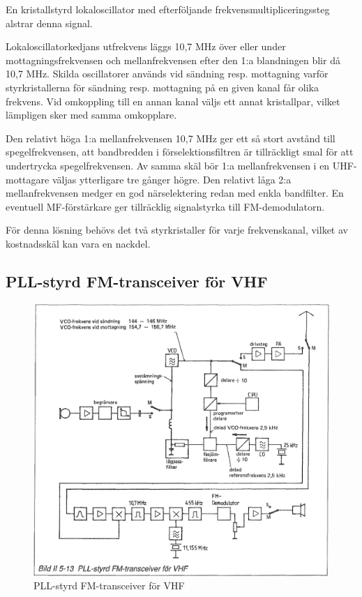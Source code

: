 

En kristallstyrd lokaloscillator med efterföljande
frekvensmultipliceringssteg alstrar denna signal.

Lokaloscillatorkedjans utfrekvens läggs 10,7 MHz över eller under
mottagningsfrekvensen och mellanfrekvensen efter den 1:a blandningen
blir då 10,7 MHz. Skilda oscillatorer används vid sändning
resp. mottagning varför styrkristallerna för sändning resp.
mottagning på en given kanal får olika frekvens. Vid omkoppling till
en annan kanal väljs ett annat kristallpar, vilket lämpligen sker med
samma omkopplare.

Den relativt höga 1:a mellanfrekvensen 10,7 MHz ger ett så stort
avstånd till spegelfrekvensen, att bandbredden i förselektionsfiltren
är tillräckligt smal för att undertrycka spegelfrekvensen. Av samma
skäl bör 1:a mellanfrekvensen i en UHF-mottagare väljas ytterligare
tre gånger högre. Den relativt låga 2:a mellanfrekvensen medger en god
närselektering redan med enkla bandfilter.  En eventuell
MF-förstärkare ger tillräcklig signalstyrka till FM-demodulatorn.

För denna lösning behövs det två styrkristaller för varje
frekvenskanal, vilket av kostnadsskäl kan vara en nackdel.

\subsection{PLL-styrd FM-transceiver för VHF}

\begin{figure}
  \includegraphics[width=\textwidth]{images/bild_2_5-13}
  \caption{PLL-styrd FM-transceiver för VHF}
  \label{fig:bildII5-13}
\end{figure}

